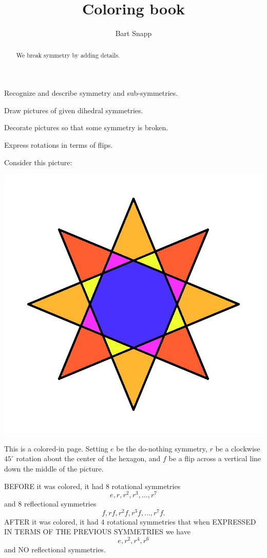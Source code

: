\documentclass[noauthor,nooutcomes,hints]{ximera}
\title{Coloring book}
\author{Bart Snapp}
\begin{document}
\begin{abstract}
  We break symmetry by adding details.
\end{abstract}
\maketitle

\begin{listOutcomes}
\item Recognize and describe symmetry and sub-symmetries.
\item Draw pictures of given dihedral symmetries.
\item Decorate pictures so that some symmetry is broken.
\item Express rotations in terms of flips.
\end{listOutcomes}


Consider this picture:
\begin{center}
  \includegraphics[width=.6\textwidth]{egR4D8.png}
\end{center}

This is a colored-in page. Setting $e$ be the do-nothing symmetry, $r$
be a clockwise $45^\circ$ rotation about the center of the hexagon,
and $f$ be a flip across a vertical line down the middle of the
picture.

BEFORE it was colored, it had $8$ rotational symmetries
\[
e,r,r^2,r^3,\dots, r^7
\]
and $8$ reflectional symmetries
\[
f,rf,r^2f, r^3f,\dots,r^7f.
\]
AFTER it was colored, it had $4$ rotational symmetries that when
EXPRESSED IN TERMS OF THE PREVIOUS SYMMETRIES we have
\[
e,r^2,r^4,r^6
\]
and NO reflectional symmetries.

\mynewpage
\end{document}
